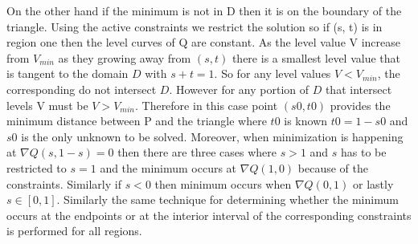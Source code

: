 On the other hand if the minimum is not in D then it is on the boundary of the triangle. Using the active constraints we restrict the solution so if (s, t) is in region one then the level curves of Q are constant. As the level value V increase from $V_{min}$ as they growing away from $(s,t)$ there is a smallest level value that is tangent to the  domain $D$ with $s+t = 1$. So for any level values $V < V_{min}$, the corresponding do not intersect $D$. However for any portion of $D$ that intersect levels V must be $V > V_{min}$. Therefore in this case point $(s0, t0)$ provides the minimum distance between P and the triangle where $t0$ is known $t0 = 1 - s0$ and $s0$ is the only unknown to be solved. Moreover, when minimization is happening at $\nabla Q(s, 1 − s) = 0$ then there are three cases where $s > 1$ and $s$ has to be restricted to $s=1$ and the minimum occurs at $\nabla Q(1, 0)$ because of the constraints. Similarly if $s < 0$ then minimum occurs when $\nabla Q(0,1)$ or lastly $s \in [0,1]$. Similarly the same technique for determining whether the minimum occurs at the endpoints or at the interior interval of the corresponding constraints is performed for all regions.

